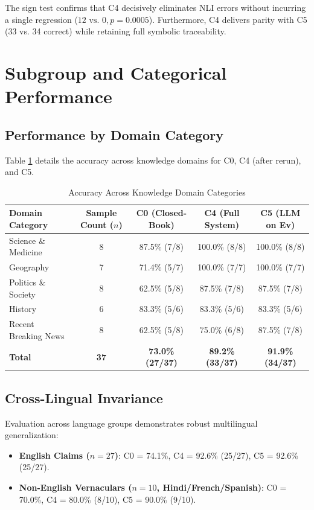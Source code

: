 \documentclass[12pt,a4paper]{report}
\begin{document}
The sign test confirms that C4 decisively eliminates NLI errors without incurring a single regression ($12 \text{ vs. } 0, p = 0.0005$). Furthermore, C4 delivers parity with C5 (33 vs. 34 correct) while retaining full symbolic traceability.

\section{Subgroup and Categorical Performance}

\subsection{Performance by Domain Category}
Table \ref{tab:category_breakdown} details the accuracy across knowledge domains for C0, C4 (after rerun), and C5.

\begin{table}[h!]
\centering
\caption{Accuracy Across Knowledge Domain Categories}
\label{tab:category_breakdown}
\begin{tabular}{|l|c|c|c|c|}
\hline
\textbf{Domain Category} & \textbf{Sample Count ($n$)} & \textbf{C0 (Closed-Book)} & \textbf{C4 (Full System)} & \textbf{C5 (LLM on Ev)} \\
\hline
Science \& Medicine & 8 & 87.5\% (7/8) & 100.0\% (8/8) & 100.0\% (8/8) \\
Geography & 7 & 71.4\% (5/7) & 100.0\% (7/7) & 100.0\% (7/7) \\
Politics \& Society & 8 & 62.5\% (5/8) & 87.5\% (7/8) & 87.5\% (7/8) \\
History & 6 & 83.3\% (5/6) & 83.3\% (5/6) & 83.3\% (5/6) \\
Recent Breaking News & 8 & 62.5\% (5/8) & 75.0\% (6/8) & 87.5\% (7/8) \\
\hline
\textbf{Total} & \textbf{37} & \textbf{73.0\% (27/37)} & \textbf{89.2\% (33/37)} & \textbf{91.9\% (34/37)} \\
\hline
\end{tabular}
\end{table}

\subsection{Cross-Lingual Invariance}
Evaluation across language groups demonstrates robust multilingual generalization:
\begin{itemize}
    \item \textbf{English Claims ($n = 27$)}: C0 = 74.1\%, C4 = 92.6\% (25/27), C5 = 92.6\% (25/27).
    \item \textbf{Non-English Vernaculars ($n = 10$, Hindi/French/Spanish)}: C0 = 70.0\%, C4 = 80.0\% (8/10), C5 = 90.0\% (9/10).
\end{itemize}
\end{document}
